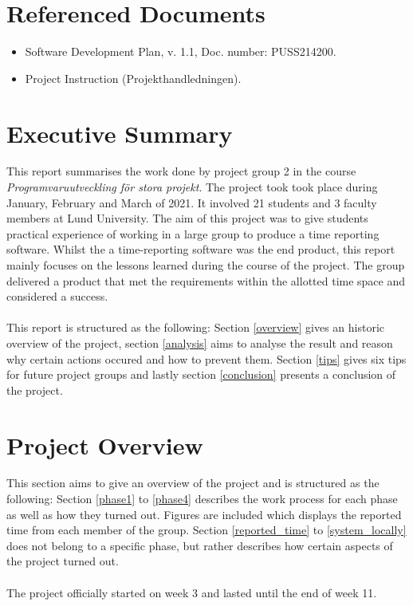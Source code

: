 \documentclass{article}
\begin{document}
\section{Referenced Documents \label{refs}}
    \begin{itemize}
        \item Software Development Plan, v. 1.1, Doc. number: PUSS214200.
        \item \label{PH} Project Instruction (Projekthandledningen).
    \end{itemize}

\newpage

\section{Executive Summary}
    This report summarises the work done by project group 2 in the course \emph{Programvaruutveckling för stora projekt}. The project took took place during January, February and March of 2021. It involved 21 students and 3 faculty members at Lund University. The aim of this project was to give students practical experience of working in a large group to produce a time reporting software. Whilst the a time-reporting software was the end product, this report mainly focuses on the lessons learned during the course of the project. The group delivered a product that met the requirements within the allotted time space and considered a success.
    \\ \\
    This report is structured as the following: Section \ref{overview} gives an historic overview of the
    project, section \ref{analysis} aims to analyse the result and reason why certain actions occured
    and how to prevent them. Section \ref{tips} gives six tips for future project groups and lastly section \ref{conclusion} presents a conclusion of the project.

\section{Project Overview \label{overview}}
    This section aims to give an overview of the project and is structured as the following:
    Section \ref{phase1} to \ref{phase4} describes the work process for each phase as well as how they turned out. Figures are included which displays the reported time from each member of the group. Section \ref{reported_time} to \ref{system_locally} does not belong to a specific phase, but rather describes how certain aspects of the project turned out. 
    \\ \\
    The project officially started on week 3 and lasted until the end of week 11.
    
\end{document}
